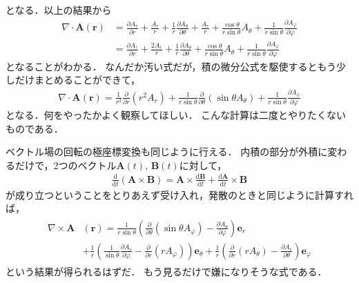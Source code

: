 となる．以上の結果から
\begin{align*}
\nabla \cdot \bm{A}(\bm{r}) & = \frac{ \partial A_r}{\partial r}
+ \frac{A_r}{r} + \frac{1}{r} \frac{ \partial A_\theta} {\partial \theta}
+ \frac{ A_r}{r} + \frac{\cos \theta}{r \sin \theta} A_\theta 
+ \frac{1}{r \sin \theta} \frac{ \partial A_\varphi}{\partial \varphi} \\
& = \frac{ \partial A_r}{\partial r} +  \frac{ 2 A_r}{r}
+ \frac{1}{r} \frac{ \partial A_\theta} {\partial \theta}
+ \frac{\cos \theta}{r \sin \theta} A_\theta 
+ \frac{1}{r \sin \theta} \frac{ \partial A_\varphi}{\partial \varphi}
\end{align*}
となることがわかる．
なんだか汚い式だが，積の微分公式を駆使するともう少しだけまとめることができて，
\begin{align}
\nabla \cdot \bm{A}(\bm{r}) = \frac{1}{r^2}
\frac{ \partial }{\partial r} ( r^2 A_r) + \frac{1}{r \sin \theta} 
\frac{ \partial }{\partial \theta} ( \sin \theta A_\theta)
+ \frac{1}{r \sin \theta} \frac{ \partial A_\varphi} {\partial \varphi}
\label{eq:divkyoku}
\end{align}
となる．何をやったかよく観察してほしい．
こんな計算は二度とやりたくないものである．

ベクトル場の回転の極座標変換も同じように行える．
内積の部分が外積に変わるだけで，2つのベクトル$\bm{A}(t), \, \bm{B}(t)$に対して，
\begin{align}
\frac{\mathrm{d}}{\mathrm{d}t} ( \bm{A} \times \bm{B} )
= \bm{A} \times \frac{\mathrm{d} \bm{B} }{\mathrm{d}t}
+ \frac{ \mathrm{d} \bm{A} } {\mathrm{d}t } \times \bm{B}
\label{eq:gaisekibibun}
\end{align}
が成り立つということをとりあえず受け入れ，発散のときと同じように計算すれば，
\begin{align}
\begin{aligned}
\nabla \times \bm{A} & ( \bm{r} ) 
= \frac{1}{r \sin \theta} \left( \frac{ \partial }{\partial \theta} ( \sin \theta A_\varphi) 
- \frac{\partial A_\theta}{\partial \varphi} \right) \bm{e}_r \\
& + \frac{1}{r} \left( \frac{1}{\sin \theta } \frac{\partial A_r}{\partial \varphi}
- \frac{ \partial }{\partial r}(rA_\varphi) \right) \bm{e}_\theta 
+ \frac{1}{r} \left( \frac{ \partial }{\partial r} ( r A_\theta) 
- \frac{\partial A_r}{\partial \theta} \right) \bm{e}_\varphi
\label{eq:rotkyoku}
\end{aligned}
\end{align}
という結果が得られるはずだ．
もう見るだけで嫌になりそうな式である．

